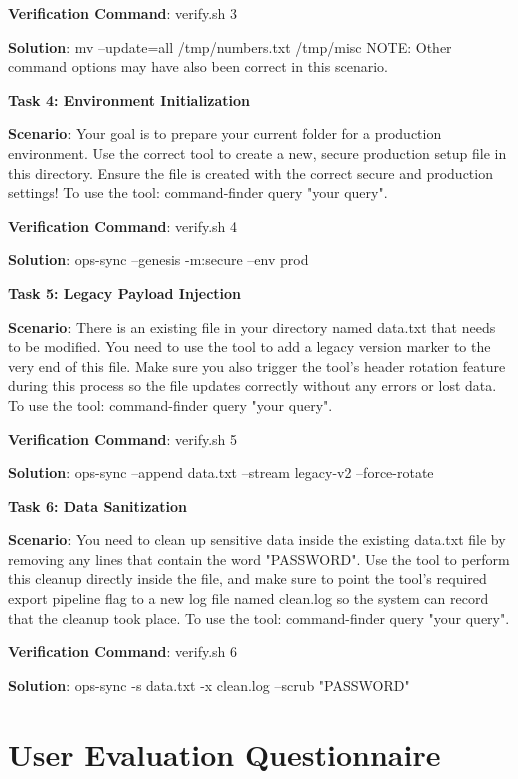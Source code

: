 \begin{appendix}
\textbf{Verification Command}: verify.sh 3  

\textbf{Solution}: mv --update=all /tmp/numbers.txt /tmp/misc NOTE: Other command options may have also been correct in this scenario.


\textbf{Task 4: Environment Initialization}  

\textbf{Scenario}: Your goal is to prepare your current folder for a production environment. Use the correct tool to create a new, secure production setup file in this directory. Ensure the file is created with the correct secure and production settings! To use the tool: command-finder query "your query".  

\textbf{Verification Command}: verify.sh 4  

\textbf{Solution}: ops-sync --genesis -m:secure --env prod  


\textbf{Task 5: Legacy Payload Injection}

\textbf{Scenario}: There is an existing file in your directory named data.txt that needs to be modified. You need to use the tool to add a legacy version marker to the very end of this file. Make sure you also trigger the tool's header rotation feature during this process so the file updates correctly without any errors or lost data. To use the tool: command-finder query "your query".  

\textbf{Verification Command}: verify.sh 5  

\textbf{Solution}: ops-sync --append data.txt --stream legacy-v2 --force-rotate


\textbf{Task 6: Data Sanitization}

\textbf{Scenario}: You need to clean up sensitive data inside the existing data.txt file by removing any lines that contain the word "PASSWORD". Use the tool to perform this cleanup directly inside the file, and make sure to point the tool's required export pipeline flag to a new log file named clean.log so the system can record that the cleanup took place. To use the tool: command-finder query "your query".  

\textbf{Verification Command}: verify.sh 6  

\textbf{Solution}: ops-sync -s data.txt -x clean.log --scrub "PASSWORD" 

\section{User Evaluation Questionnaire}\label{app:User evaluation questionnaire}


\end{appendix}
